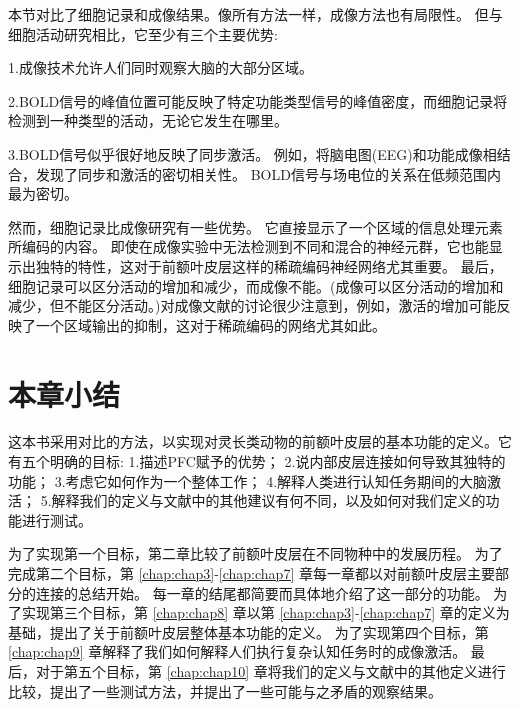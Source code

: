 \par
本节对比了细胞记录和成像结果。像所有方法一样，成像方法也有局限性。
但与细胞活动研究相比，它至少有三个主要优势:
\par 1.成像技术允许人们同时观察大脑的大部分区域。
\par 2.BOLD信号的峰值位置可能反映了特定功能类型信号的峰值密度，而细胞记录将检测到一种类型的活动，无论它发生在哪里。
\par 3.BOLD信号似乎很好地反映了同步激活。
例如，将脑电图(EEG)和功能成像相结合\cite{parkes2006combining}，发现了同步和激活的密切相关性。
BOLD信号与场电位的关系在低频范围内最为密切\cite{kayser2004comparison}。

\par 然而，细胞记录比成像研究有一些优势。
它直接显示了一个区域的信息处理元素所编码的内容。
即使在成像实验中无法检测到不同和混合的神经元群，它也能显示出独特的特性，这对于前额叶皮层这样的稀疏编码神经网络尤其重要。
最后，细胞记录可以区分活动的增加和减少，而成像不能。(成像可以区分活动的增加和减少，但不能区分活动。)对成像文献的讨论很少注意到，例如，激活的增加可能反映了一个区域输出的抑制，这对于稀疏编码的网络尤其如此。


\section{本章小结}
这本书采用对比的方法，以实现对灵长类动物的前额叶皮层的基本功能的定义。它有五个明确的目标:
1.描述PFC赋予的优势；
2.说内部皮层连接如何导致其独特的功能；
3.考虑它如何作为一个整体工作；
4.解释人类进行认知任务期间的大脑激活；
5.解释我们的定义与文献中的其他建议有何不同，以及如何对我们定义的功能进行测试。


\par

为了实现第一个目标，第二章比较了前额叶皮层在不同物种中的发展历程。
为了完成第二个目标，第 \ref{chap:chap3}-\ref{chap:chap7} 章每一章都以对前额叶皮层主要部分的连接的总结开始。
每一章的结尾都简要而具体地介绍了这一部分的功能。
为了实现第三个目标，第 \ref{chap:chap8} 章以第 \ref{chap:chap3}-\ref{chap:chap7} 章的定义为基础，提出了关于前额叶皮层整体基本功能的定义。
为了实现第四个目标，第 \ref{chap:chap9} 章解释了我们如何解释人们执行复杂认知任务时的成像激活。
最后，对于第五个目标，第 \ref{chap:chap10} 章将我们的定义与文献中的其他定义进行比较，提出了一些测试方法，并提出了一些可能与之矛盾的观察结果。



